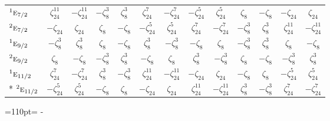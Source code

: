\documentclass[10pt,a4paper]{article}
\newcommand{\needspace}[1]{\par\penalty-100\begingroup\dimen0=#1\relax\dimen2=\pagegoal
  \advance\dimen2-\pagetotal\ifdim\dimen0>\dimen2\relax\ifdim\dimen2>0pt\vfil\break\fi\fi
  \endgroup}
\numberwithin{equation}{section}
\newcommand{\irr}[1]{\text{\normalfont\scshape #1}}
\newcommand{\conjpair}[1]{{}^{#1}}
\newcommand{\rootunity}[1]{\zeta_{#1}}
\begin{document}
{\begin{longtable}{@{}lcccccccccccc@{}}
$\conjpair{1}\irr{e}_{7/2}$ & $\rootunity{24}^{11}$ & $-\rootunity{24}^{11}$ & $-\rootunity{8}^{3}$ & $\rootunity{8}^{3}$ & $\rootunity{24}^{7}$ & $-\rootunity{24}^{7}$ & $-\rootunity{24}^{5}$ & $\rootunity{24}^{5}$ & $\rootunity{8}$ & $-\rootunity{8}$ & $-\rootunity{24}$ & $\rootunity{24}$\\
$\conjpair{2}\irr{e}_{7/2}$ & $-\rootunity{24}$ & $\rootunity{24}$ & $\rootunity{8}$ & $-\rootunity{8}$ & $-\rootunity{24}^{5}$ & $\rootunity{24}^{5}$ & $\rootunity{24}^{7}$ & $-\rootunity{24}^{7}$ & $-\rootunity{8}^{3}$ & $\rootunity{8}^{3}$ & $\rootunity{24}^{11}$ & $-\rootunity{24}^{11}$\\
$\conjpair{1}\irr{e}_{9/2}$ & $-\rootunity{8}^{3}$ & $\rootunity{8}^{3}$ & $\rootunity{8}$ & $-\rootunity{8}$ & $\rootunity{8}^{3}$ & $-\rootunity{8}^{3}$ & $-\rootunity{8}$ & $\rootunity{8}$ & $-\rootunity{8}^{3}$ & $\rootunity{8}^{3}$ & $\rootunity{8}$ & $-\rootunity{8}$\\
$\conjpair{2}\irr{e}_{9/2}$ & $\rootunity{8}$ & $-\rootunity{8}$ & $-\rootunity{8}^{3}$ & $\rootunity{8}^{3}$ & $-\rootunity{8}$ & $\rootunity{8}$ & $\rootunity{8}^{3}$ & $-\rootunity{8}^{3}$ & $\rootunity{8}$ & $-\rootunity{8}$ & $-\rootunity{8}^{3}$ & $\rootunity{8}^{3}$\\
$\conjpair{1}\irr{e}_{11/2}$ & $\rootunity{24}^{7}$ & $-\rootunity{24}^{7}$ & $\rootunity{8}^{3}$ & $-\rootunity{8}^{3}$ & $\rootunity{24}^{11}$ & $-\rootunity{24}^{11}$ & $-\rootunity{24}$ & $\rootunity{24}$ & $-\rootunity{8}$ & $\rootunity{8}$ & $-\rootunity{24}^{5}$ & $\rootunity{24}^{5}$\\*
$\conjpair{2}\irr{e}_{11/2}$ & $-\rootunity{24}^{5}$ & $\rootunity{24}^{5}$ & $-\rootunity{8}$ & $\rootunity{8}$ & $-\rootunity{24}$ & $\rootunity{24}$ & $\rootunity{24}^{11}$ & $-\rootunity{24}^{11}$ & $\rootunity{8}^{3}$ & $-\rootunity{8}^{3}$ & $\rootunity{24}^{7}$ & $-\rootunity{24}^{7}$\\
\bottomrule\end{longtable}}
\needspace{110pt}
\end{document}
